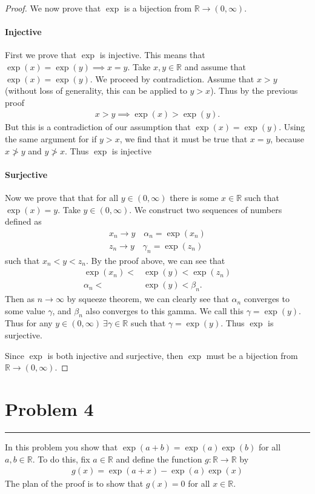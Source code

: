 \documentclass[12pt]{amsart}
\newcommand{\usec}[1]{%
  \section*{#1}%
  \noindent\rule{\textwidth}{2pt}%
  \vspace{10pt}%
}
\newcommand{\R}{\mathbb{R}}
\begin{document}
\begin{proof}
  We now prove that $\exp$ is a bijection from $\R\to(0,\infty)$.

  \paragraph{Injective}%
  \label{par:injective}
  First we prove that $\exp$ is injective. This means that
  $\exp(x)=\exp(y)\implies x=y$. Take $x,y\in\R$ and assume that
  $\exp(x)=\exp(y)$. We proceed by contradiction. Assume that $x>y$ (without
  loss of generality, this can be applied to $y>x$). Thus by the previous proof
  \begin{align*}
    x>y\implies \exp(x)>\exp(y).
  \end{align*}
  But this is a contradiction of our assumption that $\exp(x)=\exp(y)$. Using
  the same argument for if $y>x$, we find that it must be true that $x=y$,
  because $x\ngtr y$ and $y\ngtr x$. Thus $\exp$ is injective

  \paragraph{Surjective}%
  \label{par:surjective}
  Now we prove that that for all $y\in(0,\infty)$ there is some $x\in\R$ such
  that $\exp(x)=y$. Take $y\in(0,\infty)$. We construct two sequences of
  numbers defined as
  \begin{align*}
    x_n\to y\quad \alpha_n=\exp(x_n)\\
    z_n\to y\quad \gamma_n=\exp(z_n)
  \end{align*}
  such that $x_n<y<z_n$. By the proof above, we can see that
  \begin{align*}
    \exp(x_n)<&\exp(y)<\exp(z_n)\\
    \alpha_n < &\exp(y) < \beta_n.
  \end{align*}
  Then as $n\to\infty$ by squeeze theorem, we can clearly see that $\alpha_n$
  converges to some value $\gamma$, and $\beta_n$ also converges to this gamma.
  We call this $\gamma=\exp(y)$. Thus for any $y\in(0,\infty)\ \exists
  \gamma\in\R$ such that $\gamma=\exp(y)$. Thus $\exp$ is surjective.

  Since $\exp$ is both injective and surjective, then $\exp$ must be a
  bijection from $\R\to(0,\infty)$.
\end{proof}

\usec{Problem 4}%
\label{sec:problem_4}

In this problem you show that $\exp(a+b)=\exp(a)\exp(b)$ for all $a,b\in\R$. To
do this, fix $a\in \R$ and define the function $g:\R\to\R$ by
\begin{align*}
  g(x)=\exp(a+x)-\exp(a)\exp(x)
\end{align*}
The plan of the proof is to show that $g(x)=0$ for all $x\in\R$.
\end{document}
